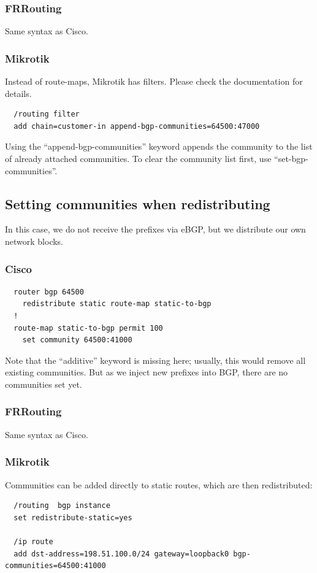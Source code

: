 \subsubsection{FRRouting}
Same syntax as Cisco.

\subsubsection{Mikrotik}
Instead of route-maps, Mikrotik has filters. Please check the documentation for details.
\begin{verbatim}
  /routing filter
  add chain=customer-in append-bgp-communities=64500:47000
\end{verbatim}
Using the ``append-bgp-communities'' keyword appends the community to the list of already attached communities. To clear the community list first, use ``set-bgp-communities''.

\subsection{Setting communities when redistributing}
In this case, we do not receive the prefixes via eBGP, but we distribute our own network blocks.

\subsubsection{Cisco}
\begin{verbatim}
  router bgp 64500
    redistribute static route-map static-to-bgp
  !
  route-map static-to-bgp permit 100
    set community 64500:41000
\end{verbatim}
Note that the ``additive'' keyword is missing here; usually, this would remove all existing communities. But as we inject new prefixes into BGP, there are no communities set yet.

\subsubsection{FRRouting}
Same syntax as Cisco.

\subsubsection{Mikrotik}
Communities can be added directly to static routes, which are then redistributed:
\begin{verbatim}
  /routing  bgp instance
  set redistribute-static=yes

  /ip route
  add dst-address=198.51.100.0/24 gateway=loopback0 bgp-communities=64500:41000
\end{verbatim}



